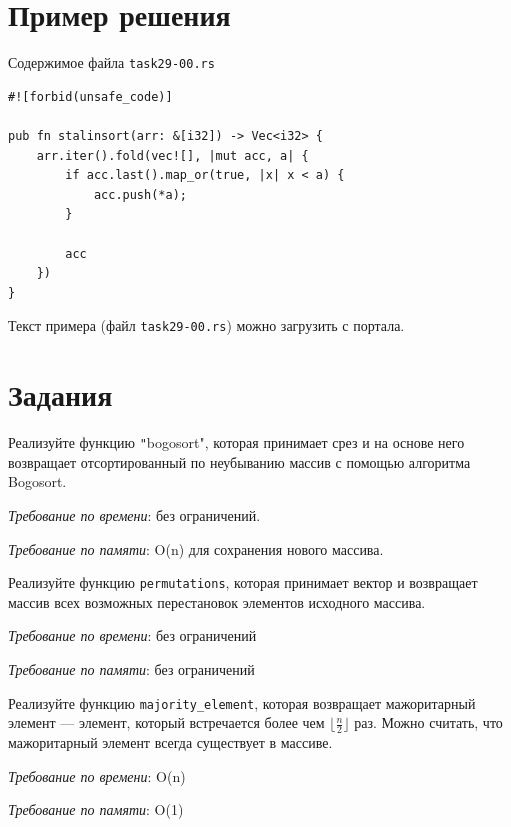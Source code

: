 \documentclass[a4paper, 10pt]{extarticle}
\begin{document}
\section{Пример решения}
Содержимое файла \verb"task29-00.rs"
\begin{verbatim}
#![forbid(unsafe_code)]

pub fn stalinsort(arr: &[i32]) -> Vec<i32> {
    arr.iter().fold(vec![], |mut acc, a| {
        if acc.last().map_or(true, |x| x < a) {
            acc.push(*a);
        }

        acc
    })
}    
\end{verbatim}


Текст примера (файл \verb"task29-00.rs") можно загрузить с портала.

\section{Задания}

\begin{tsk}[Bogosort]
Реализуйте функцию \texttt"bogosort", которая принимает срез и на основе него возвращает отсортированный по неубыванию массив с помощью алгоритма Bogosort. 

    \textit{Требование по времени}: без ограничений.

    \textit{Требование по памяти}: O(n) для сохранения нового массива.
\end{tsk}

\begin{tsk}[Перестановки]
    Реализуйте функцию \verb|permutations|, которая принимает вектор и возвращает массив всех возможных перестановок элементов исходного массива.

    \textit{Требование по времени}: без ограничений

    \textit{Требование по памяти}: без ограничений
\end{tsk}

\begin{tsk}
    Реализуйте функцию \verb|majority_element|, которая возвращает мажоритарный элемент --- элемент, который встречается более чем \(\lfloor \frac{n}{2} \rfloor\) раз. Можно считать, что мажоритарный элемент всегда существует в массиве.

    \textit{Требование по времени}: O(n)

    \textit{Требование по памяти}: O(1)
\end{tsk}
\end{document}
